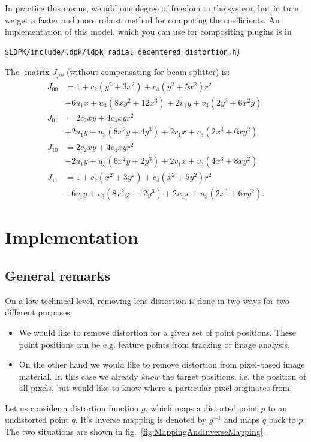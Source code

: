 \documentclass[10pt,a4paper]{article}
\begin{document}
In practice this means, we add one degree of freedom to the system,
but in turn we get a faster and more robust method for computing the coefficients.
An implementation of this model, which you can use for compositing plugins is
in
\begin{verbatim}
$LDPK/include/ldpk/ldpk_radial_decentered_distortion.h}
\end{verbatim}
The \Jacobi-matrix $J_{\mu\nu}$ (without compensating for beam-splitter) is:
\begin{align}
J_{00}	&= 1 + c_2 (y^2 + 3x^2) + c_4 (y^2 + 5x^2) r^2 \nonumber\\
	&+ 6 u_1 x + u_3 (8 x y^2 + 12 x^3)
	+ 2 v_1 y + v_3 (2 y^3 + 6 x^2 y) \nonumber\\
J_{01}	&= 2 c_2 xy + 4 c_4 xy r^2 \nonumber\\
	&+ 2 u_1 y + u_3 (8 x^2 y + 4 y^3)
	+ 2 v_1 x + v_3 (2 x^3 + 6 x y^2)\nonumber\\
J_{10}	&= 2 c_2 xy + 4 c_4 xy r^2 \nonumber\\
	&+ 2 u_1 y + u_3 (6 x^2 y + 2 y^3)
	+ 2 v_1 x + v_3 (4 x^3 + 8 x y^2) \nonumber\\
J_{11}	&= 1 + c_2 (x^2+3y^2) + c_4 (x^2 + 5y^2) r^2 \nonumber\\
	&+ 6 v_1 y + v_3 (8 x^2 y + 12 y^3)
	+ 2 u_1 x + u_3 (2 x^3 + 6 x y^2).
\end{align}


\section{Implementation}
\label{Implementation}
\subsection{General remarks}

On a low technical level, removing lens distortion is done in two ways
for two different purposes:
\begin{itemize}
\item We would like to remove distortion for a given set of point positions.
These point positions can be e.g. feature points from tracking or image analysis.
\item On the other hand we would like to remove distortion from
pixel-based image material. In this case we already {\em know} the target
positions, i.e. the position of all pixels, but would like to know where
a particular pixel originates from.
\end{itemize}
Let us consider a distortion function $g$, which maps a distorted point $p$
to an undistorted point $q$. It's inverse mapping is denoted by $g^{-1}$ and maps
$q$ back to $p$. The two situations are shown in fig.~\ref{fig:MappingAndInverseMapping}.
\end{document}
